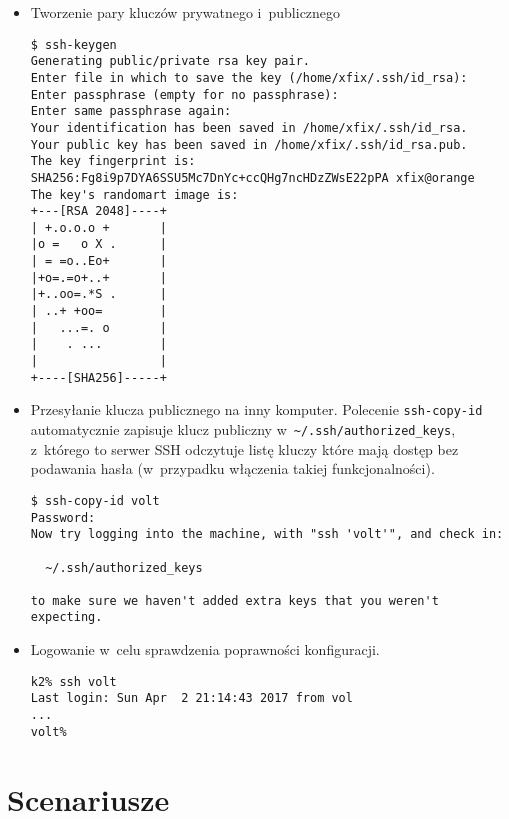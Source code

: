 \documentclass[a4paper,11pt]{article}
\begin{document}
\begin{itemize}

\item Tworzenie pary kluczów prywatnego i~publicznego

\begin{verbatim}
$ ssh-keygen 
Generating public/private rsa key pair.
Enter file in which to save the key (/home/xfix/.ssh/id_rsa): 
Enter passphrase (empty for no passphrase): 
Enter same passphrase again: 
Your identification has been saved in /home/xfix/.ssh/id_rsa.
Your public key has been saved in /home/xfix/.ssh/id_rsa.pub.
The key fingerprint is:
SHA256:Fg8i9p7DYA6SSU5Mc7DnYc+ccQHg7ncHDzZWsE22pPA xfix@orange
The key's randomart image is:
+---[RSA 2048]----+
| +.o.o.o +       |
|o =   o X .      |
| = =o..Eo+       |
|+o=.=o+..+       |
|+..oo=.*S .      |
| ..+ +oo=        |
|   ...=. o       |
|    . ...        |
|                 |
+----[SHA256]-----+
\end{verbatim}

\item Przesyłanie klucza publicznego na inny komputer. Polecenie
\verb|ssh-copy-id| automatycznie zapisuje klucz publiczny
w~\verb|~/.ssh/authorized_keys|, z~którego to serwer SSH odczytuje
listę kluczy które mają dostęp bez podawania hasła (w~przypadku
włączenia takiej funkcjonalności).

\begin{verbatim}
$ ssh-copy-id volt
Password: 
Now try logging into the machine, with "ssh 'volt'", and check in:

  ~/.ssh/authorized_keys

to make sure we haven't added extra keys that you weren't expecting.
\end{verbatim}

\item Logowanie w~celu sprawdzenia poprawności konfiguracji.

\begin{verbatim}
k2% ssh volt
Last login: Sun Apr  2 21:14:43 2017 from vol
...
volt%
\end{verbatim}

\end{itemize}

\section{Scenariusze}
\end{document}
